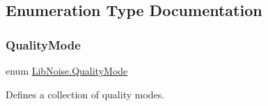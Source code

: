 \subsection{Enumeration Type Documentation}
\mbox{\label{namespace_lib_noise_ab253d2180e71b8b4b51e250163ca0e27}} 
\subsubsection{\texorpdfstring{Quality\+Mode}{QualityMode}}
{\footnotesize\ttfamily enum \hyperlink{namespace_lib_noise_ab253d2180e71b8b4b51e250163ca0e27}{Lib\+Noise.\+Quality\+Mode}\hspace{0.3cm}{\ttfamily [strong]}}



Defines a collection of quality modes. 

